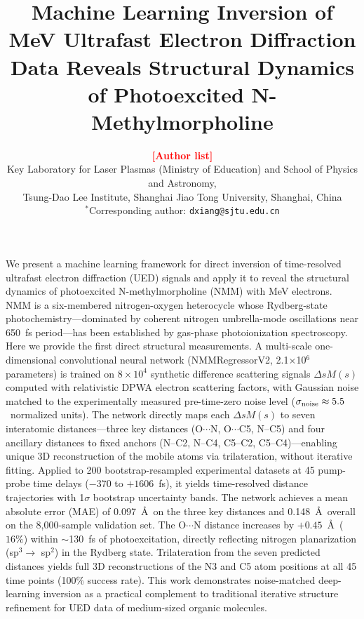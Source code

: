 \documentclass[12pt]{article}
\date{}
\renewenvironment{abstract}{\quotation}{\endquotation}
\newcommand{\dsm}{\Delta sM}
\newcommand{\TBD}[1]{\textcolor{red}{\textbf{[#1]}}}
\begin{document}
\title{\bfseries\boldmath
Machine Learning Inversion of MeV Ultrafast Electron Diffraction Data
Reveals Structural Dynamics of Photoexcited N-Methylmorpholine}

\author{
  \TBD{Author list} \\[4pt]
  \small Key Laboratory for Laser Plasmas (Ministry of Education)
    and School of Physics and Astronomy, \\
  \small Tsung-Dao Lee Institute, Shanghai Jiao Tong University,
    Shanghai, China \\[4pt]
  \small $^\ast$Corresponding author: \texttt{dxiang@sjtu.edu.cn}
}

\maketitle

\begin{abstract}
We present a machine learning framework for direct inversion of
time-resolved ultrafast electron diffraction (UED) signals and apply it
to reveal the structural dynamics of photoexcited N-methylmorpholine
(NMM) with MeV electrons. NMM is a six-membered nitrogen-oxygen
heterocycle whose Rydberg-state photochemistry---dominated by coherent
nitrogen umbrella-mode oscillations near 650~fs period---has been
established by gas-phase photoionization spectroscopy.\cite{Zhang2017,Beedle2017}
Here we provide the first direct structural measurements. A multi-scale
one-dimensional convolutional neural network (NMMRegressorV2,
2.1$\times$10$^6$ parameters) is trained on $8\times10^4$ synthetic difference
scattering signals $\dsm(s)$ computed with relativistic DPWA electron
scattering factors, with Gaussian noise matched to the experimentally
measured pre-time-zero noise level ($\sigma_{\rm noise}\approx 5.5$~normalized
units). The network directly maps each $\dsm(s)$ to seven
interatomic distances---three key distances (O$\cdots$N, O$\cdots$C5,
N--C5) and four ancillary distances to fixed anchors (N--C2, N--C4,
C5--C2, C5--C4)---enabling unique 3D reconstruction of the mobile
atoms via trilateration, without iterative fitting. Applied to 200
bootstrap-resampled experimental datasets at 45 pump-probe time delays
($-370$ to $+1606$~fs), it yields time-resolved distance trajectories
with 1$\sigma$ bootstrap uncertainty bands. The network achieves a mean
absolute error (MAE) of 0.097~\AA\ on the three key distances and
0.148~\AA\ overall on the 8,000-sample validation set. The O$\cdots$N distance increases by $+0.45$~\AA\ ($16\%$)
within $\sim$130~fs of photoexcitation, directly reflecting nitrogen
planarization (sp$^3 \to$ sp$^2$) in the Rydberg state. Trilateration
from the seven predicted distances yields full 3D reconstructions of
the N3 and C5 atom positions at all 45 time points (100\% success
rate).
This work demonstrates noise-matched deep-learning inversion as a
practical complement to traditional iterative structure refinement for
UED data of medium-sized organic molecules.
\end{abstract}
\end{document}
